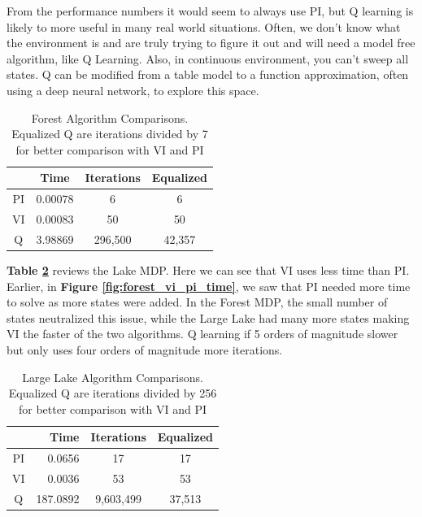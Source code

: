 \documentclass[letterpaper]{article} %
\begin{document}
From the performance numbers it would seem to always use PI, but Q learning is likely to more useful in many real world situations.  Often, we don't know what the environment is and are truly trying to figure it out and will need a model free algorithm, like Q Learning.  Also, in continuous environment, you can't sweep all states. Q can be modified from a table model to a function approximation, often using a deep neural network, to explore this space.

\begin{table}[!htb]
	\begin{center}
		\begin{tabular}{| c | c  | c | c |}
			\hline
		 	& Time & Iterations & Equalized\\ 
			\hline
			\hline
			PI & \cellcolor{SpringGreen}0.00078  &  \cellcolor{SpringGreen}6  &\cellcolor{SpringGreen} 6 \\
 			VI & 0.00083 & 50 & 50 \\  
			Q & 3.98869  & 296,500  & 42,357  \\
			\hline
		\end{tabular}
	\end{center}
	\caption{Forest Algorithm Comparisons.  Equalized Q are iterations divided by 7 for better comparison with VI and PI}
	\label{table:forest_comparisons}
\end{table}

\textbf{Table \ref{table:lake_comparisons}} reviews the Lake MDP.  Here we can see that VI uses less time than PI.  Earlier, in \textbf{Figure \ref{fig:forest_vi_pi_time}}, we saw that PI needed more time to solve as more states were added.  In the Forest MDP, the small number of states neutralized this issue, while the Large Lake had many more states making VI the faster of the two algorithms.  Q learning if 5 orders of magnitude slower but only uses four orders of magnitude more iterations. 

\begin{table}[!htb]
	\begin{center}
		\begin{tabular}{| c | r  | c | c |}
			\hline
		 	& Time & Iterations & Equalized\\ 
			\hline
			\hline
			PI & 0.0656 &   \cellcolor{SpringGreen}17  &  \cellcolor{SpringGreen}17 \\
 			VI &  \cellcolor{SpringGreen}0.0036 & 53 & 53\\  
			Q & 187.0892  & 9,603,499  & 37,513  \\
			\hline
		\end{tabular}
	\end{center}
	\caption{Large Lake Algorithm Comparisons.  Equalized Q are iterations divided by 256 for better comparison with VI and PI}
	\label{table:lake_comparisons}
\end{table}
\end{document}
